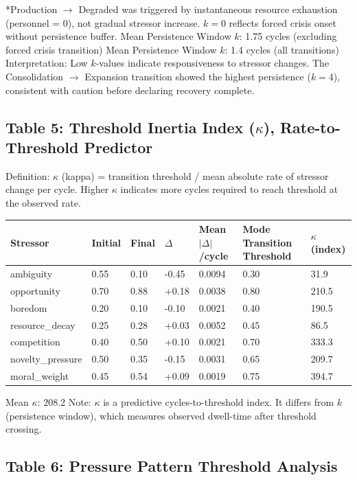 \documentclass[11pt,a4paper]{article}
\begin{document}
*Production $\to$ Degraded was triggered by instantaneous resource exhaustion (personnel = 0), not gradual stressor increase. $k = 0$ reflects forced crisis onset without persistence buffer. Mean Persistence Window $k$: 1.75 cycles (excluding forced crisis transition) Mean Persistence Window $k$: 1.4 cycles (all transitions) Interpretation: Low $k$-values indicate responsiveness to stressor changes. The Consolidation $\to$ Expansion transition showed the highest persistence ($k = 4$), consistent with caution before declaring recovery complete.

\subsection*{Table 5: Threshold Inertia Index ($\kappa$), Rate-to-Threshold Predictor}

Definition: $\kappa$ (kappa) = transition threshold / mean absolute rate of stressor change per cycle. Higher $\kappa$ indicates more cycles required to reach threshold at the observed rate.

\begin{center}
\begin{tabular}{lllllll}
\toprule
\textbf{Stressor} & \textbf{Initial} & \textbf{Final} & \textbf{$\Delta$} & \textbf{Mean $|\Delta|$/cycle} & \textbf{Mode Transition Threshold} & \textbf{$\kappa$ (index)} \\
\midrule
ambiguity & 0.55 & 0.10 & -0.45 & 0.0094 & 0.30 & 31.9 \\
opportunity & 0.70 & 0.88 & +0.18 & 0.0038 & 0.80 & 210.5 \\
boredom & 0.20 & 0.10 & -0.10 & 0.0021 & 0.40 & 190.5 \\
resource\_decay & 0.25 & 0.28 & +0.03 & 0.0052 & 0.45 & 86.5 \\
competition & 0.40 & 0.50 & +0.10 & 0.0021 & 0.70 & 333.3 \\
novelty\_pressure & 0.50 & 0.35 & -0.15 & 0.0031 & 0.65 & 209.7 \\
moral\_weight & 0.45 & 0.54 & +0.09 & 0.0019 & 0.75 & 394.7 \\
\bottomrule
\end{tabular}
\end{center}

Mean $\kappa$: 208.2 Note: $\kappa$ is a predictive cycles-to-threshold index. It differs from $k$ (persistence window), which measures observed dwell-time after threshold crossing.

\subsection*{Table 6: Pressure Pattern Threshold Analysis}
\end{document}
